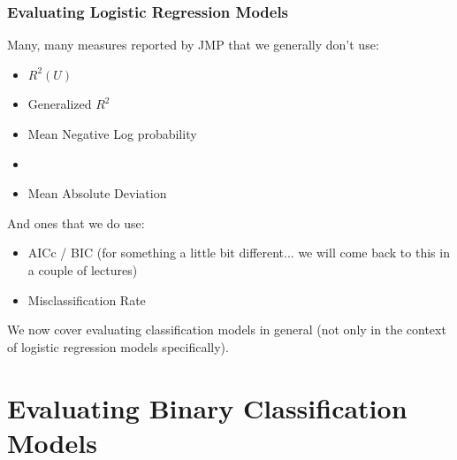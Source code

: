 \documentclass[slides]{beamer} %
\begin{document}
\begin{frame}\frametitle{Evaluating Logistic Regression Models}

Many, many measures reported by JMP that we generally don't use: \pause

\begin{itemize}
\item $R^2(U)$
\item Generalized $R^2$
\item Mean Negative Log probability
\item {}
\item Mean Absolute Deviation \pause
\end{itemize}

And ones that we do use:

\begin{itemize}
\item AICc / BIC (for something a little bit different... we will come back to this in a couple of lectures) \pause
\item Misclassification Rate \pause
\end{itemize}

We now cover evaluating classification models in general (not only in the context of logistic regression models specifically).

\end{frame}

\section{Evaluating Binary Classification Models}
\end{document}
